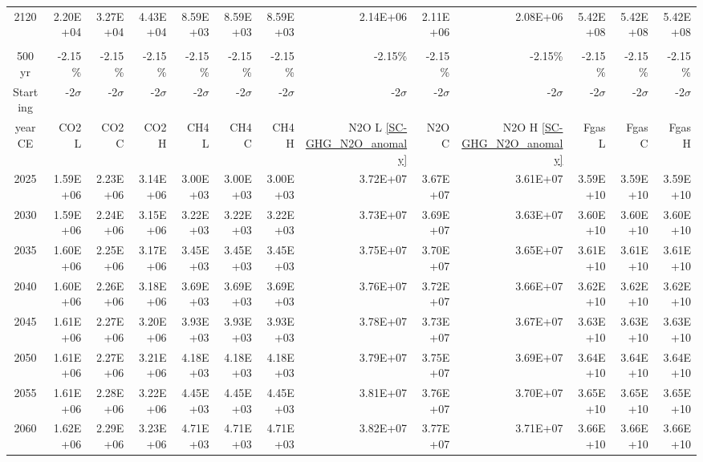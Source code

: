 \documentclass{article}
\begin{document}
\begin{table}
\begin{tabular}{crrr|rrr|rrr|rrr}
2120     & 2.20E+04   & 3.27E+04   & 4.43E+04   & 8.59E+03   & 8.59E+03   & 8.59E+03   & 2.14E+06   & 2.11E+06   & 2.08E+06   & 5.42E+08   & 5.42E+08   & 5.42E+08   \\
         &            &            &            &            &            &            &            &            &            &            &            &            \\ 
         \hline
500 yr   & -2.15\%    & -2.15\%    & -2.15\%    & -2.15\%    & -2.15\%    & -2.15\%    & -2.15\%    & -2.15\%    & -2.15\%    & -2.15\%    & -2.15\%    & -2.15\%    \\
Starting & -2$\sigma$ & -2$\sigma$ & -2$\sigma$ & -2$\sigma$ & -2$\sigma$ & -2$\sigma$ & -2$\sigma$ & -2$\sigma$ & -2$\sigma$ & -2$\sigma$ & -2$\sigma$ & -2$\sigma$ \\
year CE  & CO2 L      & CO2 C      & CO2 H      & CH4 L      & CH4 C      & CH4 H      & N2O L \ref{SC-GHG_N2O_anomaly}     & N2O C      & N2O H \ref{SC-GHG_N2O_anomaly}      & Fgas L     & Fgas C     & Fgas H     \\
2025     & 1.59E+06   & 2.23E+06   & 3.14E+06   & 3.00E+03   & 3.00E+03   & 3.00E+03   & 3.72E+07   & 3.67E+07   & 3.61E+07   & 3.59E+10   & 3.59E+10   & 3.59E+10   \\
2030     & 1.59E+06   & 2.24E+06   & 3.15E+06   & 3.22E+03   & 3.22E+03   & 3.22E+03   & 3.73E+07   & 3.69E+07   & 3.63E+07   & 3.60E+10   & 3.60E+10   & 3.60E+10   \\
2035     & 1.60E+06   & 2.25E+06   & 3.17E+06   & 3.45E+03   & 3.45E+03   & 3.45E+03   & 3.75E+07   & 3.70E+07   & 3.65E+07   & 3.61E+10   & 3.61E+10   & 3.61E+10   \\
2040     & 1.60E+06   & 2.26E+06   & 3.18E+06   & 3.69E+03   & 3.69E+03   & 3.69E+03   & 3.76E+07   & 3.72E+07   & 3.66E+07   & 3.62E+10   & 3.62E+10   & 3.62E+10   \\
2045     & 1.61E+06   & 2.27E+06   & 3.20E+06   & 3.93E+03   & 3.93E+03   & 3.93E+03   & 3.78E+07   & 3.73E+07   & 3.67E+07   & 3.63E+10   & 3.63E+10   & 3.63E+10   \\
2050     & 1.61E+06   & 2.27E+06   & 3.21E+06   & 4.18E+03   & 4.18E+03   & 4.18E+03   & 3.79E+07   & 3.75E+07   & 3.69E+07   & 3.64E+10   & 3.64E+10   & 3.64E+10   \\
2055     & 1.61E+06   & 2.28E+06   & 3.22E+06   & 4.45E+03   & 4.45E+03   & 4.45E+03   & 3.81E+07   & 3.76E+07   & 3.70E+07   & 3.65E+10   & 3.65E+10   & 3.65E+10   \\
2060     & 1.62E+06   & 2.29E+06   & 3.23E+06   & 4.71E+03   & 4.71E+03   & 4.71E+03   & 3.82E+07   & 3.77E+07   & 3.71E+07   & 3.66E+10   & 3.66E+10   & 3.66E+10   \\

\end{tabular}
\end{table}
\end{document}
